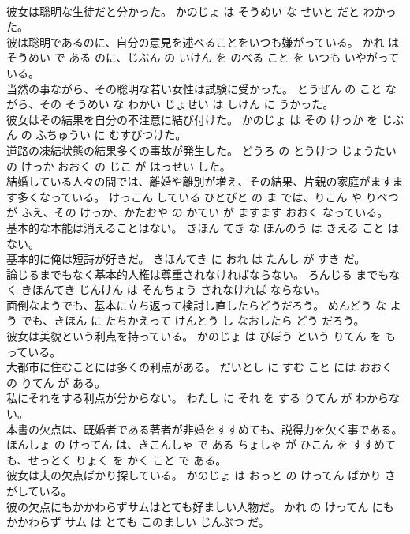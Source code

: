 \documentclass[8pt]{extreport}
\begin{document}
\begin{CJK}{UTF8}{min}
\\	彼女は聡明な生徒だと分かった。	かのじょ は そうめい な せいと だと わかった。	
\\	彼は聡明であるのに、自分の意見を述べることをいつも嫌がっている。	かれ は そうめい で ある のに、じぶん の いけん を のべる こと を いつも いやがっている。	
\\	当然の事ながら、その聡明な若い女性は試験に受かった。	とうぜん の こと ながら、その そうめい な わかい じょせい は しけん に うかった。	
\\	彼女はその結果を自分の不注意に結び付けた。	かのじょ は その けっか を じぶん の ふちゅうい に むすびつけた。	
\\	道路の凍結状態の結果多くの事故が発生した。	どうろ の とうけつ じょうたい の けっか おおく の じこ が はっせい した。	
\\	結婚している人々の間では、離婚や離別が増え、その結果、片親の家庭がますます多くなっている。	けっこん している ひとびと の ま では、りこん や りべつ が ふえ、その けっか、かたおや の かてい が ますます おおく なっている。	
\\	基本的な本能は消えることはない。	きほん てき な ほんのう は きえる こと は ない。	
\\	基本的に俺は短詩が好きだ。	きほんてき に おれ は たんし が すき だ。	
\\	論じるまでもなく基本的人権は尊重されなければならない。	ろんじる までもなく きほんてき じんけん は そんちょう されなければ ならない。	
\\	面倒なようでも、基本に立ち返って検討し直したらどうだろう。	めんどう な よう でも、きほん に たちかえって けんとう し なおしたら どう だろう。	
\\	彼女は美貌という利点を持っている。	かのじょ は びぼう という りてん を もっている。	
\\	大都市に住むことには多くの利点がある。	だいとし に すむ こと には おおく の りてん が ある。	
\\	私にそれをする利点が分からない。	わたし に それ を する りてん が わからない。	
\\	本書の欠点は、既婚者である著者が非婚をすすめても、説得力を欠く事である。	ほんしょ の けってん は、きこんしゃ で ある ちょしゃ が ひこん を すすめても、せっとく りょく を かく こと で ある。	
\\	彼女は夫の欠点ばかり探している。	かのじょ は おっと の けってん ばかり さがしている。	
\\	彼の欠点にもかかわらずサムはとても好ましい人物だ。	かれ の けってん にも かかわらず サム は とても このましい じんぶつ だ。	

\end{CJK}
\end{document}
